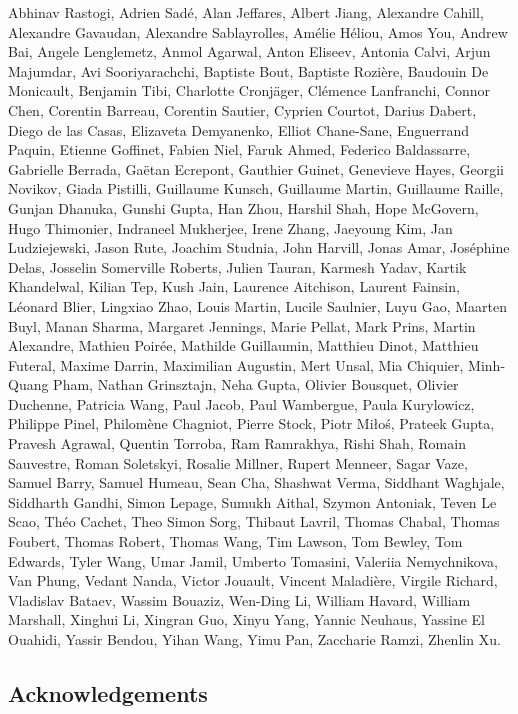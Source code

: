 \documentclass{article}
\begin{document}
Abhinav Rastogi, Adrien Sadé, Alan Jeffares, Albert Jiang, Alexandre Cahill, Alexandre Gavaudan, Alexandre Sablayrolles, Amélie Héliou, Amos You, Andrew Bai, Angele Lenglemetz, Anmol Agarwal, Anton Eliseev, Antonia Calvi, Arjun Majumdar, Avi Sooriyarachchi, Baptiste Bout, Baptiste Rozière, Baudouin De Monicault, Benjamin Tibi, Charlotte Cronjäger, Clémence Lanfranchi, Connor Chen, Corentin Barreau, Corentin Sautier, Cyprien Courtot, Darius Dabert, Diego de las Casas, Elizaveta Demyanenko, Elliot Chane-Sane, Enguerrand Paquin, Etienne Goffinet, Fabien Niel, Faruk Ahmed, Federico Baldassarre, Gabrielle Berrada, Gaëtan Ecrepont, Gauthier Guinet, Genevieve Hayes, Georgii Novikov, Giada Pistilli, Guillaume Kunsch, Guillaume Martin, Guillaume Raille, Gunjan Dhanuka, Gunshi Gupta, Han Zhou, Harshil Shah, Hope McGovern, Hugo Thimonier, Indraneel Mukherjee, Irene Zhang, Jaeyoung Kim, Jan Ludziejewski, Jason Rute, Joachim Studnia, John Harvill, Jonas Amar, Joséphine Delas, Josselin Somerville Roberts, Julien Tauran, Karmesh Yadav, Kartik Khandelwal, Kilian Tep, Kush Jain, Laurence Aitchison, Laurent Fainsin, Léonard Blier, Lingxiao Zhao, Louis Martin, Lucile Saulnier, Luyu Gao, Maarten Buyl, Manan Sharma, Margaret Jennings, Marie Pellat, Mark Prins, Martin Alexandre, Mathieu Poirée, Mathilde Guillaumin, Matthieu Dinot, Matthieu Futeral, Maxime Darrin, Maximilian Augustin, Mert Unsal, Mia Chiquier, Minh-Quang Pham, Nathan Grinsztajn, Neha Gupta, Olivier Bousquet, Olivier Duchenne, Patricia Wang, Paul Jacob, Paul Wambergue, Paula Kurylowicz, Philippe Pinel, Philomène Chagniot, Pierre Stock, Piotr Miłoś, Prateek Gupta, Pravesh Agrawal, Quentin Torroba, Ram Ramrakhya, Rishi Shah, Romain Sauvestre, Roman Soletskyi, Rosalie Millner, Rupert Menneer, Sagar Vaze, Samuel Barry, Samuel Humeau, Sean Cha, Shashwat Verma, Siddhant Waghjale, Siddharth Gandhi, Simon Lepage, Sumukh Aithal, Szymon Antoniak, Teven Le Scao, Théo Cachet, Theo Simon Sorg, Thibaut Lavril, Thomas Chabal, Thomas Foubert, Thomas Robert, Thomas Wang, Tim Lawson, Tom Bewley, Tom Edwards, Tyler Wang, Umar Jamil, Umberto Tomasini, Valeriia Nemychnikova, Van Phung, Vedant Nanda, Victor Jouault, Vincent Maladière, Virgile Richard, Vladislav Bataev, Wassim Bouaziz, Wen-Ding Li, William Havard, William Marshall, Xinghui Li, Xingran Guo, Xinyu Yang, Yannic Neuhaus, Yassine El Ouahidi, Yassir Bendou, Yihan Wang, Yimu Pan, Zaccharie Ramzi, Zhenlin Xu.

\subsection{Acknowledgements}
\end{document}
